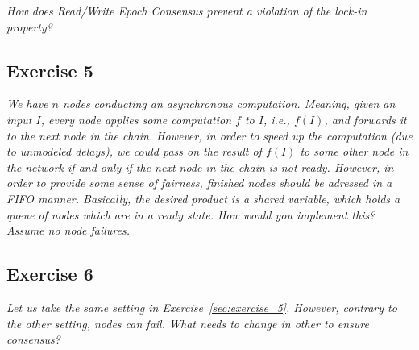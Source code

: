 \emph{How does Read/Write Epoch Consensus prevent a violation of the lock-in property?}

\subsection*{Exercise 5}
\label{sec:exercise_5}

\emph{We have $n$ nodes conducting an asynchronous computation. Meaning, given an input $I$, every node applies some computation $f$ to $I$, i.e., $f(I)$, and forwards it to the next node in the chain. However, in order to speed up the computation (due to unmodeled delays), we could pass on the result of $f(I)$ to some other node in the network if and only if the next node in the chain is not ready. However, in order to provide some sense of fairness, finished nodes should be adressed in a FIFO manner. Basically, the desired product is a shared variable, which holds a queue of nodes which are in a ready state. How would you implement this? Assume no node failures.}

\subsection*{Exercise 6}
\label{sec:exercise_6}

\emph{Let us take the same setting in Exercise~\ref{sec:exercise_5}. However, contrary to the other setting, nodes can fail. What needs to change in other to ensure consensus?}


